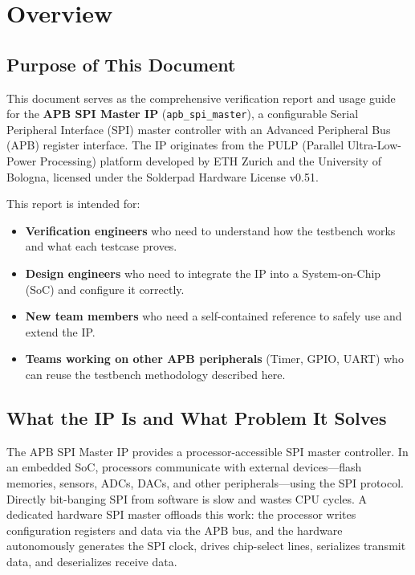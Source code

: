 \chapter{Overview}
\label{ch:overview}

\section{Purpose of This Document}

This document serves as the comprehensive verification report and usage guide for the
\textbf{APB SPI Master IP} (\texttt{apb\_spi\_master}), a configurable Serial Peripheral Interface
(SPI) master controller with an Advanced Peripheral Bus (APB) register interface. The IP originates
from the PULP (Parallel Ultra-Low-Power Processing) platform developed by ETH Zurich and the
University of Bologna, licensed under the Solderpad Hardware License v0.51.

This report is intended for:
\begin{itemize}[leftmargin=2em]
  \item \textbf{Verification engineers} who need to understand how the testbench works and what
        each testcase proves.
  \item \textbf{Design engineers} who need to integrate the IP into a System-on-Chip (SoC) and
        configure it correctly.
  \item \textbf{New team members} who need a self-contained reference to safely use and extend the IP.
  \item \textbf{Teams working on other APB peripherals} (Timer, GPIO, UART) who can reuse the
        testbench methodology described here.
\end{itemize}

\section{What the IP Is and What Problem It Solves}

The APB SPI Master IP provides a processor-accessible SPI master controller. In an embedded SoC,
processors communicate with external devices---flash memories, sensors, ADCs, DACs, and other
peripherals---using the SPI protocol. Directly bit-banging SPI from software is slow and wastes
CPU cycles. A dedicated hardware SPI master offloads this work: the processor writes configuration
registers and data via the APB bus, and the hardware autonomously generates the SPI clock, drives
chip-select lines, serializes transmit data, and deserializes receive data.

